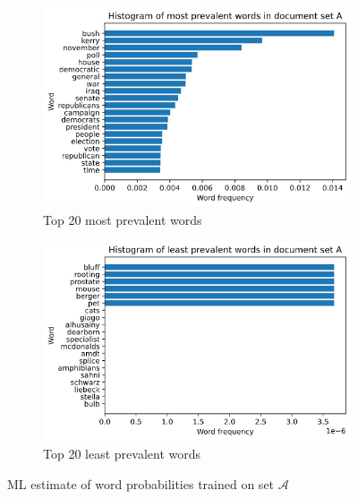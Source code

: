 \documentclass[]{article}
\newcommand{\Acal}{\mathcal{A}}
\begin{document}
\begin{figure}[!h]
	\begin{subfigure}{0.5\linewidth}
		\centering
		\includegraphics[width=\linewidth]{hist-ml.png}
		\caption{Top 20 most prevalent words}
		\label{fig:hist-ml-max}
	\end{subfigure}
	\begin{subfigure}{0.5\linewidth}
		\centering
		\includegraphics[width=\linewidth]{hist-ml-min.png}
		\caption{Top 20 least prevalent words}
		\label{fig:hist-ml-min}
	\end{subfigure}
	\caption{ML estimate of word probabilities trained on set $\Acal$}
	\label{fig:hist-ml}
\end{figure}
\end{document}
